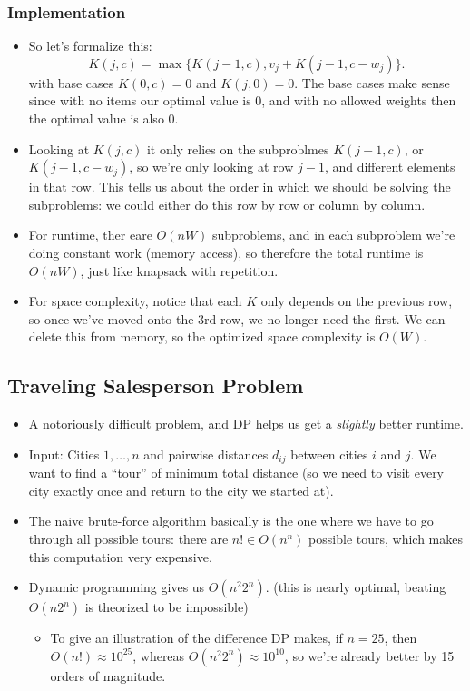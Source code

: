 \subsubsection{Implementation}
\begin{itemize}
	\item So let's formalize this:
		\[
			K(j, c) = \max\{ K(j-1, c), v_j + K(j-1, c - w_j)\}
		.\]
		with base cases $K(0, c) = 0$ and $K(j, 0) = 0$. The base cases make sense since with no items our 
		optimal value is 0, and with no allowed weights then the optimal value is also 0. 

	\item Looking at $K(j, c)$ it only relies on the subproblmes $K(j-1, c)$, or $K(j-1, c - w_j)$, so we're 
		only looking at row $j-1$, and different elements in that row. This tells us about the order in which 
		we should be solving the subproblems: we could either do this row by row or column by column. 
	\item For runtime, ther eare $O(nW)$ subproblems, and in each subproblem we're doing constant 
		work (memory access), so therefore the total runtime is $O(nW)$, just like knapsack with repetition. 
	\item For space complexity, notice that each $K$ only depends on the previous row, so once we've 
		moved onto the 3rd row, we no longer need the first. We can delete this from memory, so the optimized 
		space complexity is $O(W)$. 
\end{itemize}
\subsection{Traveling Salesperson Problem}
\begin{itemize}
	\item A notoriously difficult problem, and DP helps us get a \textit{slightly} better runtime. 
	\item Input: Cities $1, \dots, n$ and pairwise distances $d_{ij}$ between cities $i$ and $j$. We want to 
		find a ``tour'' of minimum total distance (so we need to visit every city exactly once and 
		return to the city we started at).
	\item The naive brute-force algorithm basically is the one where we have to go through all possible 
		tours: there are \( n! \in O(n^n) \) possible tours, which makes this computation very expensive. 
	\item Dynamic programming gives us $O(n^2 2^n)$. (this is nearly optimal, beating $O(n 2^n)$ is theorized
		to be impossible)
		\begin{itemize}
			\item To give an illustration of the difference DP makes, if $n = 25$, then $O(n!) \approx 10^{25}$, 
				whereas $O(n^2 2^n) \approx 10^{10}$, so we're already better by 15 orders of magnitude. 
		\end{itemize}
\end{itemize}
